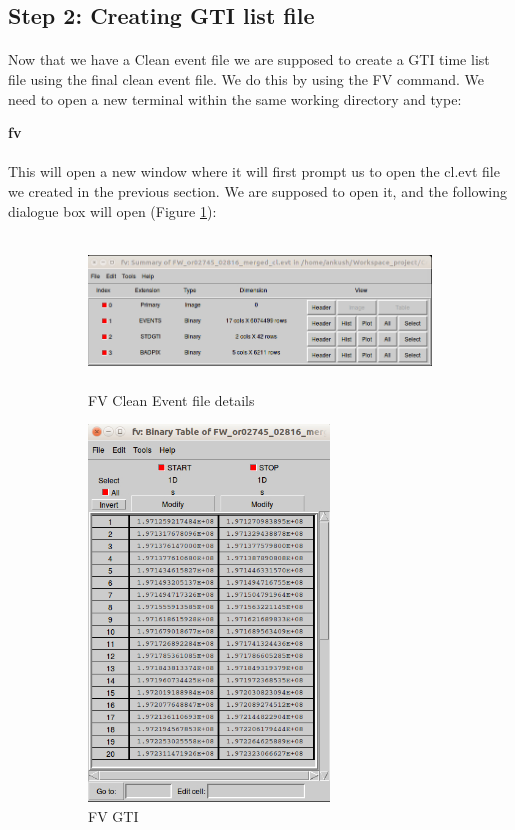 \documentclass[a4paper,twoside]{report}
\numberwithin{equation}{section}
\begin{document}
\subsection{Step 2: Creating GTI list file}
\paragraph{}
Now that we have a Clean event file we are supposed to create a GTI time list file using the final clean event file.  We do this by using the FV command. We need to open a new terminal within the same working directory and type:
\begin{center}
\item \large \textbf {fv}
\end{center}
\paragraph{}
This will open a new window where it will first prompt us to open the cl.evt file we created in the previous section. We are supposed to open it, and the following dialogue box will open (Figure \ref{FV_one}):
\begin{figure}[h]
\begin{subfigure}{0.6\textwidth}
\includegraphics[width=1.0\linewidth, height=4cm]{Step_3.jpg} 
\caption{FV Clean Event file details}
\label{FV_one}
\end{subfigure}
\begin{subfigure}{0.36\textwidth}
\includegraphics[width=1.0\linewidth, height=10cm]{Step_4.jpg}
\caption{FV GTI}
\label{FV_two}
\end{subfigure}
\caption{}
\label{FV_GTI}
\end{figure}
\end{document}
